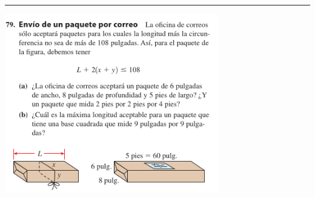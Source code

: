 \documentclass[
  letterpaper,
  DIV=11,
  numbers=noendperiod]{scrartcl}
\begin{document}
\begin{center}\rule{0.5\linewidth}{0.5pt}\end{center}

\includegraphics[width=0.7\textwidth,height=\textheight]{problema3.png}
\end{document}

